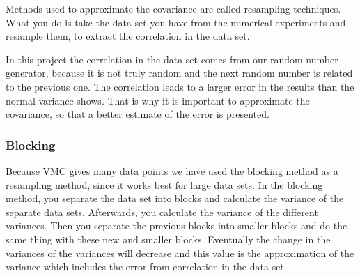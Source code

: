 Methods used to approximate the covariance are called resampling techniques. What you do is take the data set you have from the numerical experiments and resample them, to extract the correlation in the data set. 

In this project the correlation in the data set comes from our random number generator, because it is not truly random and the next random number is related to the previous one. The correlation leads to a larger error in the results than the normal variance shows. That is why it is important to approximate the covariance, so that a better estimate of the error is presented.

\subsubsection{Blocking}

Because VMC gives many data points we have used the blocking method as a resampling method, since it works best for large data sets. In the blocking method, you separate the data set into blocks and calculate the variance of the separate data sets. Afterwards, you calculate the variance of the different variances. Then you separate the previous blocks into smaller blocks and do the same thing with these new and smaller blocks. Eventually the change in the variances of the variances will decrease and this value is the approximation of the variance which includes the error from correlation in the data set.

%
